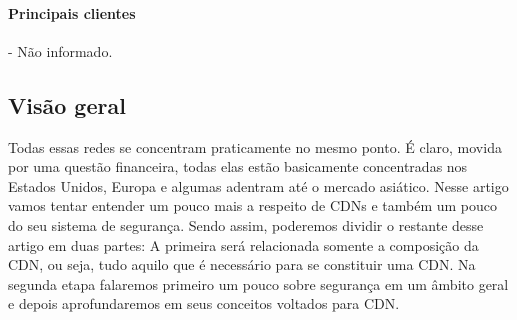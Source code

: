\paragraph{Principais clientes}- N\~ao informado.
\subsection{Vis\~ao geral}
Todas essas redes se concentram praticamente no mesmo ponto. \'E claro, movida por uma quest\~ao financeira, todas elas est\~ao basicamente concentradas nos Estados Unidos, Europa e algumas adentram at\'e o mercado asi\'atico.
\newline
Nesse artigo vamos tentar entender um pouco mais a respeito de CDNs e tamb\'em um pouco do seu sistema de seguran\c{c}a. Sendo assim, poderemos dividir o restante desse artigo em duas partes: A primeira ser\'a relacionada somente a composi\c{c}\~ao da CDN, ou seja, tudo aquilo que \'e necess\'ario para se constituir uma CDN. Na segunda etapa falaremos primeiro um pouco sobre seguran\c{c}a em um \^ambito geral e depois aprofundaremos em seus conceitos voltados para CDN.